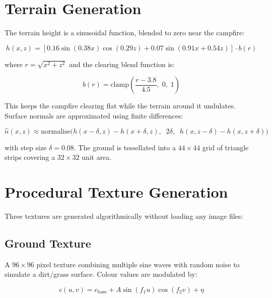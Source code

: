 \documentclass[12pt,a4paper]{report}
\begin{document}
\section{Terrain Generation}

The terrain height is a sinusoidal function, blended to zero near the campfire:

\begin{equation}
h(x,z) = \left[0.16 \sin(0.38x) \cos(0.29z) + 0.07 \sin(0.91x + 0.54z)\right] \cdot b(r)
\label{eq:terrain}
\end{equation}

where $r = \sqrt{x^2 + z^2}$ and the clearing blend function is:

\begin{equation}
b(r) = \text{clamp}\!\left(\frac{r - 3.8}{4.5},\; 0,\; 1\right)
\label{eq:blend}
\end{equation}

This keeps the campfire clearing flat while the terrain around it undulates.
Surface normals are approximated using finite differences:

\begin{equation}
\hat{n}(x,z) \approx \text{normalise}\!\bigl(h(x-\delta,z)-h(x+\delta,z),\;\; 2\delta,\;\; h(x,z-\delta)-h(x,z+\delta)\bigr)
\label{eq:normal}
\end{equation}

with step size $\delta = 0.08$.
The ground is tessellated into a $44 \times 44$ grid of triangle strips covering a $32 \times 32$ unit area.

\section{Procedural Texture Generation}

Three textures are generated algorithmically without loading any image files:

\subsection{Ground Texture}

A $96 \times 96$ pixel texture combining multiple sine waves with random noise to simulate a dirt/grass surface.
Colour values are modulated by:

\begin{equation}
c(u,v) = c_{\text{base}} + A \sin(f_1 u) \cos(f_2 v) + \eta
\label{eq:groundtex}
\end{equation}
\end{document}
